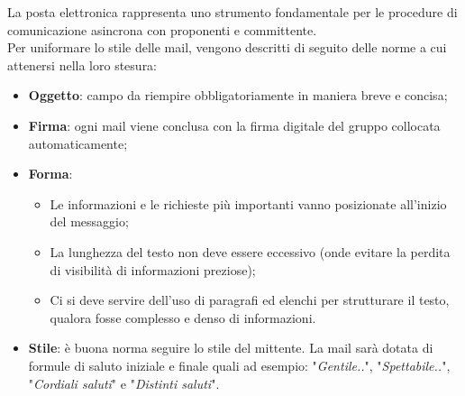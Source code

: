 \documentclass[10pt, a4paper]{article}
\begin{document}
     La posta elettronica rappresenta uno strumento fondamentale per le procedure di comunicazione asincrona con proponenti e committente.\\ 
    Per uniformare lo stile delle mail, vengono descritti di seguito delle norme a cui attenersi nella loro stesura:
    \begin{itemize}
        \item \textbf{Oggetto}: campo da riempire obbligatoriamente in maniera breve e concisa;
        \item \textbf{Firma}: ogni mail viene conclusa con la firma digitale del gruppo collocata automaticamente;
        \item \textbf{Forma}:
        \begin{itemize}
            \item Le informazioni e le richieste più importanti vanno posizionate all'inizio del messaggio;
            \item La lunghezza del testo non deve essere eccessivo (onde evitare la perdita di visibilità di informazioni preziose);
            \item Ci si deve servire dell'uso di paragrafi ed elenchi per strutturare il testo, qualora fosse complesso e denso di informazioni.
        \end{itemize} 
        \item \textbf{Stile}: è buona norma seguire lo stile del mittente. La mail sarà dotata di formule di saluto iniziale e finale quali 
        ad esempio: "\textit{Gentile..}", "\textit{Spettabile..}", "\textit{Cordiali saluti}" e "\textit{Distinti saluti}".
    \end{itemize}
    
\end{document}
